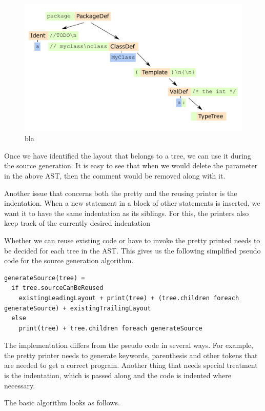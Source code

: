 \documentclass[10pt,a4paper,oneside]{scrreprt}
\begin{document}
\begin{figure}
 \centering
 \includegraphics[width=0.8\linewidth]{ast_with_layout.pdf}
 \caption{bla}
 \label{figure:ast_with_layout}
\end{figure}

Once we have identified the layout that belongs to a tree, we can use it during the source generation. It is easy to see that when we would delete the parameter in the above AST, then the comment would be removed along with it.

Another issue that concerns both the pretty and the reusing printer is the indentation. When a new statement in a block of other statements is inserted, we want it to have the same indentation as its siblings. For this, the printers also keep track of the currently desired indentation


Whether we can reuse existing code or have to invoke the pretty printed needs to be decided for each tree in the AST. This gives us the following simplified pseudo code for the source generation algorithm.

\begin{lstlisting}
generateSource(tree) = 
  if tree.sourceCanBeReused
    existingLeadingLayout + print(tree) + (tree.children foreach generateSource) + existingTrailingLayout
  else
    print(tree) + tree.children foreach generateSource
\end{lstlisting}

The implementation differs from the pseudo code in several ways. For example, the pretty printer needs to generate keywords, parenthesis and other tokens that are needed to get a correct program. Another thing that needs special treatment is the indentation, which is passed along and the code is indented where necessary.





 The basic algorithm looks as follows.
\end{document}
